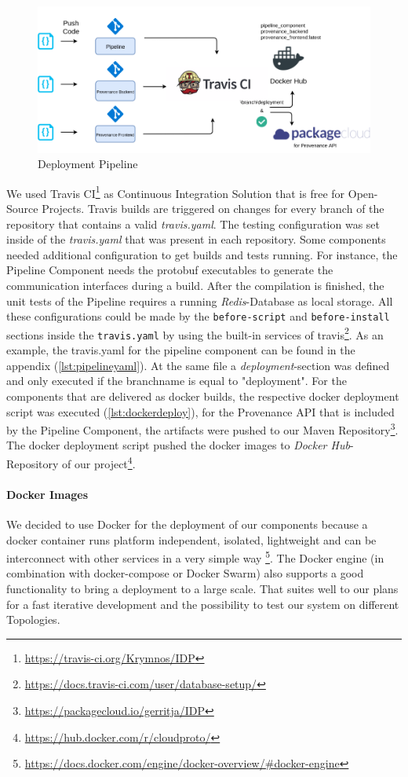 \begin{figure}[h!]
	\includegraphics[width=\textwidth]{figures/deployment.png}
	\caption{Deployment Pipeline}
	\label{fig:deployment}
\end{figure}

We used Travis CI\footnote{\url{https://travis-ci.org/Krymnos/IDP}} as Continuous Integration Solution that is free for Open-Source Projects. Travis builds are triggered on changes for every branch of the repository that contains a valid \emph{travis.yaml}.
The testing configuration was set inside of the \emph{travis.yaml} that was present in each repository. Some components needed additional configuration to get builds and tests running. For instance, the Pipeline Component needs the protobuf executables to generate the communication interfaces during a build. After the compilation is finished, the unit tests of the Pipeline requires a running \emph{Redis}-Database as local storage. All these configurations could be made by the \texttt{before-script} and \texttt{before-install} sections inside the \texttt{travis.yaml} by using the built-in services of travis\footnote{\url{https://docs.travis-ci.com/user/database-setup/}}. As an example, the travis.yaml for the pipeline component can be found in the appendix (\ref{lst:pipelineyaml}).
At the same file a \emph{deployment}-section was defined and only executed if the branchname is equal to "deployment". For the components that are delivered as docker builds, the respective docker deployment script was executed (\ref{lst:dockerdeploy}), for the Provenance API that is included by the Pipeline Component, the artifacts were pushed to our Maven Repository\footnote{\url{https://packagecloud.io/gerritja/IDP}}. The docker deployment script pushed the docker images to \emph{Docker Hub}-Repository of our project\footnote{\url{https://hub.docker.com/r/cloudproto/}}.

\paragraph*{Docker Images}
We decided to use Docker for the deployment of our components because a docker container runs platform independent, isolated, lightweight and can be interconnect with other services in a very simple way \footnote{\url{https://docs.docker.com/engine/docker-overview/\#docker-engine}}. The Docker engine (in combination with docker-compose or Docker Swarm) also supports a good functionality to bring a deployment to a large scale. That suites well to our plans for a fast iterative development and the possibility to test our system on different Topologies.

